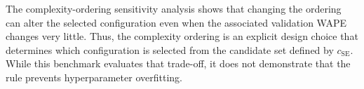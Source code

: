The complexity-ordering sensitivity analysis shows that changing the ordering can alter the selected configuration even when the associated validation WAPE changes very little. Thus, the complexity ordering is an explicit design choice that determines which configuration is selected from the candidate set defined by \(c_{\mathrm{SE}}\). While this benchmark evaluates that trade-off, it does not demonstrate that the rule prevents hyperparameter overfitting.
